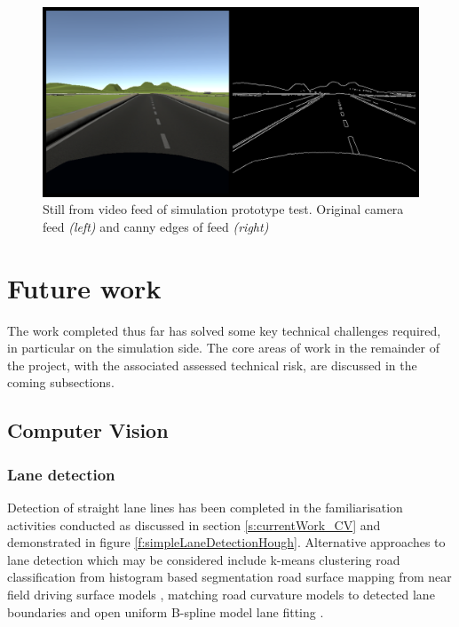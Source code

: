 \documentclass[]{aiaa-tc}%
\begin{document}
\begin{figure}[htb]%
 \includegraphics{simPrototypeIPC.png}
 \caption{Still from video feed of simulation prototype test. Original camera feed \textit{(left)} and canny edges of feed \textit{(right)}}
 \label{f:simPrototypeIPCTest}
\end{figure}

\section{Future work}

The work completed thus far has solved some key technical challenges required, in particular on the simulation side. The core areas of work in the remainder of the project, with the associated assessed technical risk, are discussed in the coming subsections.

\subsection{Computer Vision}

\subsubsection{Lane detection}

Detection of straight lane lines has been completed in the familiarisation activities conducted as discussed in section \ref{s:currentWork_CV} and demonstrated in figure \ref{f:simpleLaneDetectionHough}. Alternative approaches to lane detection which may be considered include k-means clustering \citep{ipmBasedLaneDetectionApproach} road classification from histogram based segmentation \citep{histogramSegmentationRoadClassification} road surface mapping from near field driving surface models \citep{darpaChallengeRoadDetection}, matching road curvature models to detected lane boundaries \citep{intersectionDetectionSingleCamera}  and open uniform B-spline model lane fitting \citep{ipmBasedLaneDetectionApproach}.
\end{document}
